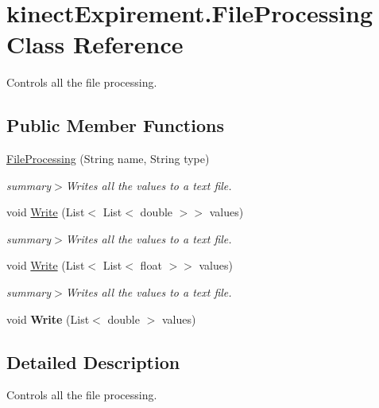 \hypertarget{classkinect_expirement_1_1_file_processing}{}\section{kinect\+Expirement.\+File\+Processing Class Reference}
\label{classkinect_expirement_1_1_file_processing}


Controls all the file processing. 


\subsection*{Public Member Functions}
\begin{DoxyCompactItemize}
\item 
\hyperlink{classkinect_expirement_1_1_file_processing_a7b8d9a2bd1d33f6e1379479673a0593e}{File\+Processing} (String name, String type)
\begin{DoxyCompactList}\small\item\em summary$>$Writes all the values to a text file.\end{DoxyCompactList}\item 
void \hyperlink{classkinect_expirement_1_1_file_processing_ae8afb28ed378a0e2c5c84bcdd1ac022c}{Write} (List$<$ List$<$ double $>$$>$ values)
\begin{DoxyCompactList}\small\item\em summary$>$Writes all the values to a text file.\end{DoxyCompactList}\item 
void \hyperlink{classkinect_expirement_1_1_file_processing_ab934081ab1dbf83efd6657a46b8c8bd2}{Write} (List$<$ List$<$ float $>$$>$ values)
\begin{DoxyCompactList}\small\item\em summary$>$Writes all the values to a text file.\end{DoxyCompactList}\item 
void {\bfseries Write} (List$<$ double $>$ values)\hypertarget{classkinect_expirement_1_1_file_processing_ae55d0c73887aa70b0004ec83140b9974}{}\label{classkinect_expirement_1_1_file_processing_ae55d0c73887aa70b0004ec83140b9974}

\end{DoxyCompactItemize}


\subsection{Detailed Description}
Controls all the file processing.



